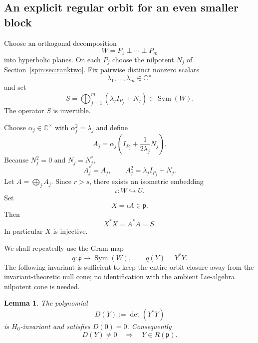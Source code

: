 \documentclass[11pt,reqno]{amsart}
\numberwithin{equation}{section}
\newtheorem{lemma}[theorem]{Lemma}
\theoremstyle{definition}
\theoremstyle{remark}
\newcommand{\C}{\mathbb C}
\newcommand{\Sym}{\operatorname{Sym}}
\newcommand{\fp}{\mathfrak p}
\begin{document}
\subsection{An explicit regular orbit for an even smaller block}\label{spin:sec:even-orbit}

Choose an orthogonal decomposition
\begin{equation}\label{spin:eq:Wdecomp}
  W=P_1\perp\cdots\perp P_m
\end{equation}
into hyperbolic planes.  On each $P_j$ choose the nilpotent $N_j$ of
Section~\ref{spin:sec:ranktwo}.  Fix pairwise distinct nonzero scalars
\begin{equation}\label{spin:eq:lambdas}
  \lambda_1,\ldots,\lambda_m\in\C^\times
\end{equation}
and set
\begin{equation}\label{spin:eq:Sdef}
  S=\bigoplus_{j=1}^m(\lambda_jI_{P_j}+N_j)\in\Sym(W).
\end{equation}
The operator $S$ is invertible.

Choose $\alpha_j\in\C^\times$ with $\alpha_j^2=\lambda_j$ and define
\begin{equation}\label{spin:eq:Aj}
  A_j=\alpha_j\left(I_{P_j}+\frac{1}{2\lambda_j}N_j\right).
\end{equation}
Because $N_j^2=0$ and $N_j=N_j^*$,
\[
  A_j^*=A_j,
  \qquad
  A_j^2=\lambda_jI_{P_j}+N_j.
\]
Let $A=\bigoplus_jA_j$.  Since $r>s$, there exists an isometric embedding
\[
  \iota:W\hookrightarrow U.
\]
Set
\begin{equation}\label{spin:eq:Xdef}
  X=\iota A\in\fp.
\end{equation}
Then
\begin{equation}\label{spin:eq:Xgram}
  X^*X=A^*A=S.
\end{equation}
In particular $X$ is injective.

We shall repeatedly use the Gram map
\begin{equation}\label{spin:eq:gram-map}
  q:\fp\longrightarrow\Sym(W),
  \qquad
  q(Y)=Y^*Y.
\end{equation}
The following invariant is sufficient to keep the entire orbit closure away
from the invariant-theoretic null cone; no identification with the ambient
Lie-algebra nilpotent cone is needed.

\begin{lemma}\label{spin:lem:det-detects-R}
The polynomial
\[
  D(Y):=\det(Y^*Y)
\]
is $H_0$-invariant and satisfies $D(0)=0$.  Consequently
\[
  D(Y)\ne0\quad\Longrightarrow\quad Y\in R(\fp).
\]
\end{lemma}
\end{document}
